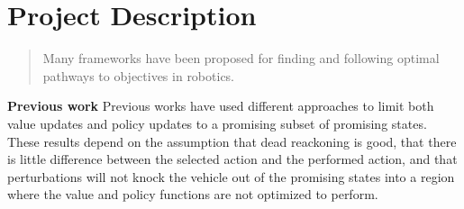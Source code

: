 \documentclass[12pt]{article}
\begin{document}
\section{Project Description}

\begin{abstract}
Many frameworks have been proposed for finding and following optimal pathways to objectives in robotics. 
\end{abstract}
\textbf{Previous work}
Previous works have used different approaches to limit both value updates and policy updates to a promising subset of promising states. These results depend on the assumption that dead reackoning is good, that there is little difference between the selected action and the performed action, and that perturbations will not knock the vehicle out of the promising states into a region where the value and policy functions are not optimized to perform.
\end{document}
